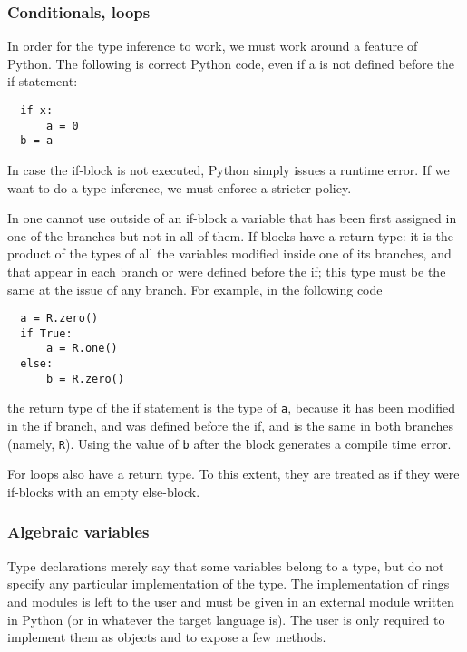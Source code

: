 \subsubsection{Conditionals, loops}
\label{sec:conditionals-loops}
In order for the type inference to work, we must work around a feature
of Python. The following is correct Python code, even if a is not
defined before the if statement:
\begin{lstlisting}
  if x:
      a = 0
  b = a
\end{lstlisting}
In case the if-block is not executed, Python simply issues a runtime
error. If we want to do a type inference, we must enforce a stricter
policy.

In \tALpy{} one cannot use outside of an if-block a variable that has
been first assigned in one of the branches but not in all of them.
If-blocks have a return type: it is the product of the types of all
the variables modified inside one of its branches, and that appear in
each branch or were defined before the if; this type must be the same
at the issue of any branch. For example, in the following code
\begin{lstlisting}
  a = R.zero()
  if True:
      a = R.one()
  else:
      b = R.zero()
\end{lstlisting}
the return type of the if statement is the type of \lstinline{a},
because it has been modified in the if branch, and was defined before
the if, and is the same in both branches (namely,
\lstinline{R}). Using the value of \lstinline{b} after the block
generates a compile time error.

For loops also have a return type. To this extent, they are treated as
if they were if-blocks with an empty else-block.



\subsubsection{Algebraic variables}
\label{sec:algebraicvar}
 Type declarations merely say that some
variables belong to a type, but do not specify any particular
implementation of the type. The implementation of rings and modules is
left to the user and must be given in an external module written in
Python (or in whatever the target language is). The user is only
required to implement them as objects and to expose a few methods.

